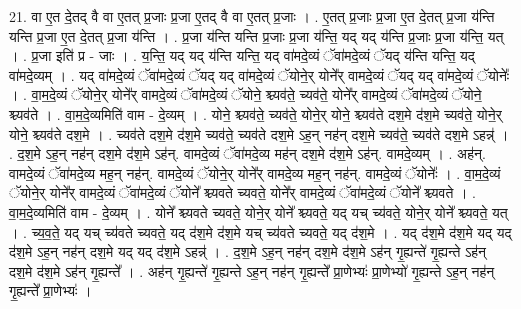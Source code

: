 \documentclass[17pt]{extarticle}
\begin{document}
21. वा ए॒त दे॒तद् वै वा ए॒तत् प्र॒जाः प्र॒जा ए॒तद् वै वा ए॒तत् प्र॒जाः । . ए॒तत् प्र॒जाः प्र॒जा ए॒त दे॒तत् प्र॒जा य॑न्ति यन्ति प्र॒जा ए॒त दे॒तत् प्र॒जा य॑न्ति । . प्र॒जा य॑न्ति यन्ति प्र॒जाः प्र॒जा य॑न्ति॒ यद् यद् य॑न्ति प्र॒जाः प्र॒जा य॑न्ति॒ यत् । . प्र॒जा इति॑ प्र - जाः । . य॒न्ति॒ यद् यद् य॑न्ति यन्ति॒ यद् वा॑मदे॒व्यं ॅवा॑मदे॒व्यं ॅयद् य॑न्ति यन्ति॒ यद् वा॑मदे॒व्यम् । . यद् वा॑मदे॒व्यं ॅवा॑मदे॒व्यं ॅयद् यद् वा॑मदे॒व्यं ॅयोने॒र् योने᳚र् वामदे॒व्यं ॅयद् यद् वा॑मदे॒व्यं ॅयोनेः᳚ । . वा॒म॒दे॒व्यं ॅयोने॒र् योने᳚र् वामदे॒व्यं ॅवा॑मदे॒व्यं ॅयोने॒ श्च्यव॑ते॒ च्यव॑ते॒ योने᳚र् वामदे॒व्यं ॅवा॑मदे॒व्यं ॅयोने॒ श्च्यव॑ते । . वा॒म॒दे॒व्यमिति॑ वाम - दे॒व्यम् । . योने॒ श्च्यव॑ते॒ च्यव॑ते॒ योने॒र् योने॒ श्च्यव॑ते दश॒मे द॑श॒मे च्यव॑ते॒ योने॒र् योने॒ श्च्यव॑ते दश॒मे । . च्यव॑ते दश॒मे द॑श॒मे च्यव॑ते॒ च्यव॑ते दश॒मे ऽह॒न् नह॑न् दश॒मे च्यव॑ते॒ च्यव॑ते दश॒मे ऽहन्न्॑ । . द॒श॒मे ऽह॒न् नह॑न् दश॒मे द॑श॒मे ऽह॑न्. वामदे॒व्यं ॅवा॑मदे॒व्य मह॑न् दश॒मे द॑श॒मे ऽह॑न्. वामदे॒व्यम् । . अह॑न्. वामदे॒व्यं ॅवा॑मदे॒व्य मह॒न् नह॑न्. वामदे॒व्यं ॅयोने॒र् योने᳚र् वामदे॒व्य मह॒न् नह॑न्. वामदे॒व्यं ॅयोनेः᳚ । . वा॒म॒दे॒व्यं ॅयोने॒र् योने᳚र् वामदे॒व्यं ॅवा॑मदे॒व्यं ॅयोने᳚ श्च्यवते च्यवते॒ योने᳚र् वामदे॒व्यं ॅवा॑मदे॒व्यं ॅयोने᳚ श्च्यवते । . वा॒म॒दे॒व्यमिति॑ वाम - दे॒व्यम् । . योने᳚ श्च्यवते च्यवते॒ योने॒र् योने᳚ श्च्यवते॒ यद् यच् च्य॑वते॒ योने॒र् योने᳚ श्च्यवते॒ यत् । . च्य॒व॒ते॒ यद् यच् च्य॑वते च्यवते॒ यद् द॑श॒मे द॑श॒मे यच् च्य॑वते च्यवते॒ यद् द॑श॒मे । . यद् द॑श॒मे द॑श॒मे यद् यद् द॑श॒मे ऽह॒न् नह॑न् दश॒मे यद् यद् द॑श॒मे ऽहन्न्॑ । . द॒श॒मे ऽह॒न् नह॑न् दश॒मे द॑श॒मे ऽह॑न् गृ॒ह्यन्ते॑ गृ॒ह्यन्ते ऽह॑न् दश॒मे द॑श॒मे ऽह॑न् गृ॒ह्यन्ते᳚ । . अह॑न् गृ॒ह्यन्ते॑ गृ॒ह्यन्ते ऽह॒न् नह॑न् गृ॒ह्यन्ते᳚ प्रा॒णेभ्यः॑ प्रा॒णेभ्यो॑ गृ॒ह्यन्ते ऽह॒न् नह॑न् गृ॒ह्यन्ते᳚ प्रा॒णेभ्यः॑ । \newline
\end{document}

